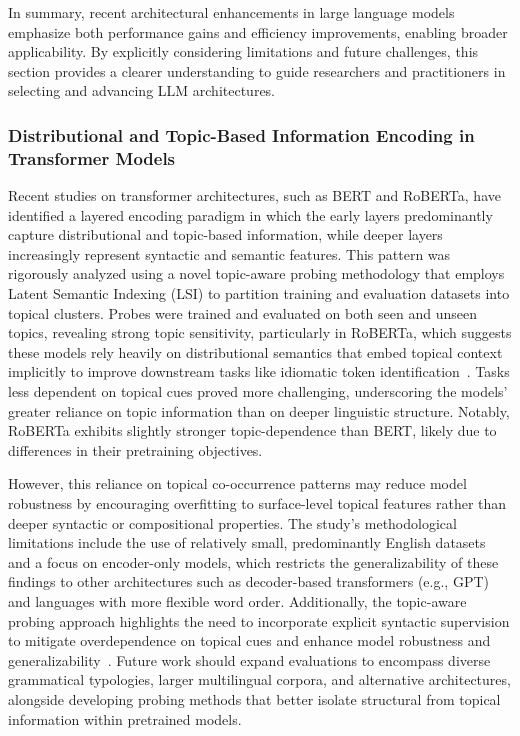 \documentclass[sigconf]{acmart}
\begin{document}
In summary, recent architectural enhancements in large language models emphasize both performance gains and efficiency improvements, enabling broader applicability. By explicitly considering limitations and future challenges, this section provides a clearer understanding to guide researchers and practitioners in selecting and advancing LLM architectures.

\subsubsection{Distributional and Topic-Based Information Encoding in Transformer Models}

Recent studies on transformer architectures, such as BERT and RoBERTa, have identified a layered encoding paradigm in which the early layers predominantly capture distributional and topic-based information, while deeper layers increasingly represent syntactic and semantic features. This pattern was rigorously analyzed using a novel topic-aware probing methodology that employs Latent Semantic Indexing (LSI) to partition training and evaluation datasets into topical clusters. Probes were trained and evaluated on both seen and unseen topics, revealing strong topic sensitivity, particularly in RoBERTa, which suggests these models rely heavily on distributional semantics that embed topical context implicitly to improve downstream tasks like idiomatic token identification~\cite{ref44}. Tasks less dependent on topical cues proved more challenging, underscoring the models' greater reliance on topic information than on deeper linguistic structure. Notably, RoBERTa exhibits slightly stronger topic-dependence than BERT, likely due to differences in their pretraining objectives.

However, this reliance on topical co-occurrence patterns may reduce model robustness by encouraging overfitting to surface-level topical features rather than deeper syntactic or compositional properties. The study’s methodological limitations include the use of relatively small, predominantly English datasets and a focus on encoder-only models, which restricts the generalizability of these findings to other architectures such as decoder-based transformers (e.g., GPT) and languages with more flexible word order. Additionally, the topic-aware probing approach highlights the need to incorporate explicit syntactic supervision to mitigate overdependence on topical cues and enhance model robustness and generalizability~\cite{ref44}. Future work should expand evaluations to encompass diverse grammatical typologies, larger multilingual corpora, and alternative architectures, alongside developing probing methods that better isolate structural from topical information within pretrained models.
\end{document}

